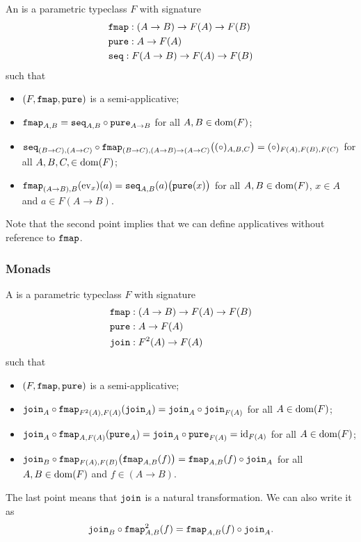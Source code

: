 \begin{definition}
An  is a parametric typeclass $F$ with signature
\begin{align*}
&\mathtt{fmap}: (A\to B) \to F(A) \to F(B) \\
&\mathtt{pure}: A\to F(A) \\
&\mathtt{seq}: F(A\to B) \to F(A) \to F(B)
\end{align*}
such that
\begin{itemize}
\item $\sSet{F,\fmap, \pure}$ is a semi-applicative;
\item $\mathtt{fmap}_{A,B} = \mathtt{seq}_{A,B} \circ \mathtt{pure}_{A\to B}$ for all $A,B\in \operatorname{dom}(F)$;
\item $\mathtt{seq}_{(B\to C), (A\to C)} \circ \mathtt{fmap}_{(B\to C), (A\to B)\to (A\to C)} \big((\circ)_{A,B,C}\big) = (\circ)_{F(A), F(B), F(C)}$ for all $A,B,C,\in \operatorname{dom}(F)$;
\item $\mathtt{fmap}_{(A\to B), B}(\operatorname{ev}_x)(a) = \mathtt{seq}_{A,B}(a)\big(\mathtt{pure}(x)\big)$ for all $A,B\in \operatorname{dom}(F)$, $x\in A$ and $a\in F(A\to B)$. 
\end{itemize}
\end{definition}
Note that the second point implies that we can define applicatives without reference to $\mathtt{fmap}$.

\subsubsection{Monads}
\begin{definition}
A  is a parametric typeclass $F$ with signature
\begin{align*}
&\mathtt{fmap}: (A\to B) \to F(A) \to F(B) \\
&\mathtt{pure}: A\to F(A) \\
&\mathtt{join}: F^2(A) \to F(A)
\end{align*}
such that
\begin{itemize}
\item $\sSet{F,\fmap, \pure}$ is a semi-applicative;
\item $\mathtt{join}_{A} \circ \mathtt{fmap}_{F^2(A), F(A)}(\mathtt{join}_A) = \mathtt{join}_A \circ \mathtt{join}_{F(A)}$ for all $A\in \operatorname{dom}(F)$;
\item $\mathtt{join}_{A}\circ \mathtt{fmap}_{A, F(A)}(\mathtt{pure}_A) = \mathtt{join}_A \circ \mathtt{pure}_{F(A)} = \operatorname{id}_{F(A)}$ for all $A\in \operatorname{dom}(F)$;
\item $\mathtt{join}_B \circ \mathtt{fmap}_{F(A), F(B)}\big(\mathtt{fmap}_{A,B}(f)\big) = \mathtt{fmap}_{A,B}(f)\circ \mathtt{join}_A$ for all $A, B\in \operatorname{dom}(F)$ and $f\in (A\to B)$.
\end{itemize}
\end{definition}
The last point means that $\mathtt{join}$ is a natural transformation. We can also write it as
\[ \mathtt{join}_B \circ \mathtt{fmap}^2_{A,B}(f) = \mathtt{fmap}_{A,B}(f)\circ \mathtt{join}_A. \]

